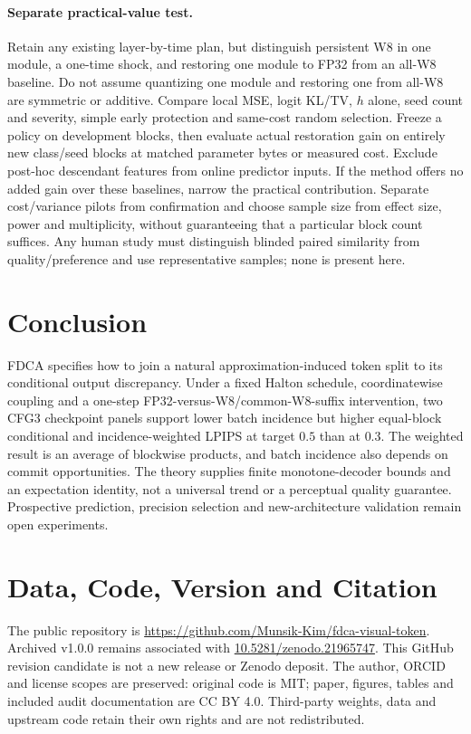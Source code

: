 \documentclass[11pt,a4paper]{article}
\theoremstyle{plain}
\theoremstyle{definition}
\theoremstyle{remark}
\begin{document}
\paragraph{Separate practical-value test.}
Retain any existing layer-by-time plan, but distinguish persistent W8 in one
module, a one-time shock, and restoring one module to FP32 from an all-W8
baseline. Do not assume quantizing one module and restoring one from all-W8 are
symmetric or additive. Compare local MSE, logit KL/TV, $h$ alone, seed count and
severity, simple early protection and same-cost random selection. Freeze a
policy on development blocks, then evaluate actual restoration gain on entirely
new class/seed blocks at matched parameter bytes or measured cost. Exclude
post-hoc descendant features from online predictor inputs. If the method offers
no added gain over these baselines, narrow the practical contribution.
Separate cost/variance pilots from confirmation and choose sample size from
effect size, power and multiplicity, without guaranteeing that a particular
block count suffices. Any human study must distinguish blinded paired similarity
from quality/preference and use representative samples; none is present here.

\section{Conclusion}
FDCA specifies how to join a natural approximation-induced token split to its
conditional output discrepancy. Under a fixed Halton schedule, coordinatewise
coupling and a one-step FP32-versus-W8/common-W8-suffix intervention, two CFG3
checkpoint panels support lower batch incidence but higher equal-block
conditional and incidence-weighted LPIPS at target $0.5$ than at $0.3$.
The weighted result is an average of blockwise products, and batch incidence
also depends on commit opportunities. The theory supplies finite monotone-decoder
bounds and an expectation identity, not a universal trend or a perceptual quality
guarantee. Prospective prediction, precision selection and new-architecture
validation remain open experiments.

\section*{Data, Code, Version and Citation}
The public repository is
\url{https://github.com/Munsik-Kim/fdca-visual-token}.
Archived v1.0.0 remains associated with
\href{https://doi.org/10.5281/zenodo.21965747}{10.5281/zenodo.21965747}.
This GitHub revision candidate is not a new release or Zenodo deposit. The author,
ORCID and license scopes are preserved: original code is MIT; paper, figures,
tables and included audit documentation are CC BY 4.0. Third-party weights,
data and upstream code retain their own rights and are not redistributed.
\end{document}
